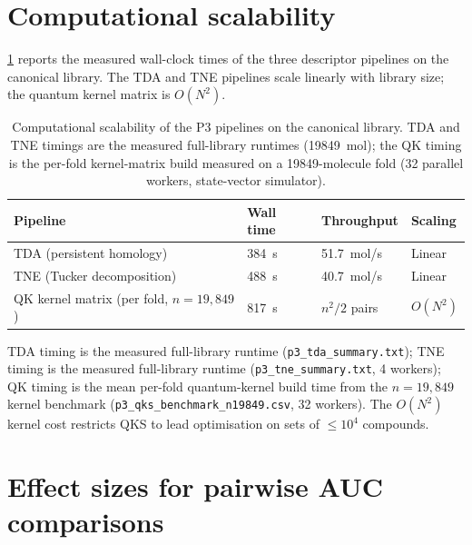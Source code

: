 \documentclass[11pt,a4paper]{article}
\begin{document}
\section{Computational scalability}
\label{sec:scalability}

\cref{tab:scalability} reports the measured wall-clock times of the three descriptor pipelines on the canonical library. The TDA and TNE pipelines scale linearly with library size; the quantum kernel matrix is $O(N^2)$.

\begin{table}[htbp]
\centering
\caption{Computational scalability of the P3 pipelines on the canonical library. TDA and TNE timings are the measured full-library runtimes (\SI{19849}{mol}); the QK timing is the per-fold kernel-matrix build measured on a \num{19849}-molecule fold (32 parallel workers, state-vector simulator).}
\label{tab:scalability}
\begin{tabularx}{\textwidth}{l l l l}
\toprule
Pipeline & {Wall time} & {Throughput} & {Scaling} \\
\midrule
TDA (persistent homology) & \SI{384}{\second} & 51.7~mol/s & Linear \\
TNE (Tucker decomposition) & \SI{488}{\second} & 40.7~mol/s & Linear \\
QK kernel matrix (per fold, $n=19{,}849$) & \SI{817}{\second} & $n^2/2$ pairs & $O(N^2)$ \\
\bottomrule
\end{tabularx}
\vspace{1mm}
\footnotesize TDA timing is the measured full-library runtime (\texttt{p3\_tda\_summary.txt}); TNE timing is the measured full-library runtime (\texttt{p3\_tne\_summary.txt}, 4 workers); QK timing is the mean per-fold quantum-kernel build time from the $n=19{,}849$ kernel benchmark (\texttt{p3\_qks\_benchmark\_n19849.csv}, 32 workers). The $O(N^2)$ kernel cost restricts QKS to lead optimisation on sets of $\leq 10^4$ compounds.
\end{table}


\section{Effect sizes for pairwise AUC comparisons}
\label{sec:effect_sizes}
\end{document}
